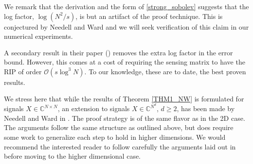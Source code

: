 \documentclass[11pt, oneside]{article}   %
\newcommand{\bC}{\mathbb{C}}
\renewcommand{\O}{\mathcal{O}}
\begin{document}
We remark that the derivation and the form of \eqref{strong_sobolev} suggests that the log factor, $\log(N^2/s)$, is but an artifact of the proof technique. This is 
conjectured by Needell and Ward and we will seek verification of this claim in our 
numerical experiments. 

A secondary result in their paper (\!\!\cite[Theorem 6]{needell2013stable}) removes the extra log factor in the error bound. However, this comes at a cost of requiring the sensing matrix to have the RIP of order $\O(s\log^3N)$. To our knowledge, these are to date, the best proven results.

We stress here that while the results of Theorem \ref{THM1_NW} is formulated 
for signals $X \in \bC^{N\times N}$, an extension to signals $X \in \bC^{N^d}$, 
$d \geq 2$, has been made by Needell and Ward in \cite{needell2013near}. The proof strategy is of the same flavor as in the 2D case. The arguments follow the 
same structure as outlined above, but does require some work to generalize each 
step to hold in higher dimensions.    We would recommend the interested reader 
to follow carefully the arguments laid out in \cite{needell2013stable} before 
moving to the higher dimensional case.
\end{document}

